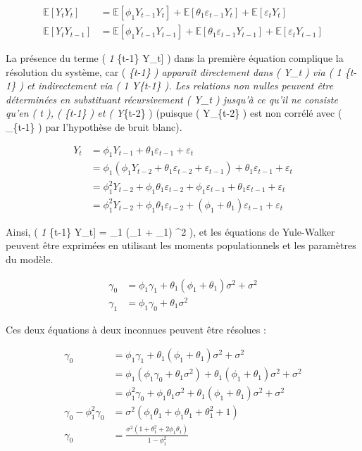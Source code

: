 \documentclass[
  letterpaper,
  DIV=11,
  numbers=noendperiod]{scrartcl}
\begin{document}
\[
\begin{aligned}
\mathbb{E}[Y_t Y_t] &= \mathbb{E}[\phi_1 Y_{t-1} Y_t] + \mathbb{E}[\theta_1 \varepsilon_{t-1} Y_t] + \mathbb{E}[\varepsilon_t Y_t] \\
\mathbb{E}[Y_t Y_{t-1}] &= \mathbb{E}[\phi_1 Y_{t-1} Y_{t-1}] + \mathbb{E}[\theta_1 \varepsilon_{t-1} Y_{t-1}] + \mathbb{E}[\varepsilon_t Y_{t-1}]
\end{aligned}
\]

La présence du terme ( \mathbb{E}{[}\theta\emph{1 \varepsilon}\{t-1\}
Y\_t{]} ) dans la première équation complique la résolution du système,
car ( \varepsilon\emph{\{t-1\} ) apparaît directement dans ( Y\_t ) via
( \theta\emph{1 \varepsilon}\{t-1\} ) et indirectement via ( \phi\emph{1
Y}\{t-1\} ). Les relations non nulles peuvent être déterminées en
substituant récursivement ( Y\_t ) jusqu'à ce qu'il ne consiste qu'en (
\varepsilon\emph{t ), ( \varepsilon}\{t-1\} ) et ( Y}\{t-2\} ) (puisque
( Y\_\{t-2\} ) est non corrélé avec ( \varepsilon\_\{t-1\} ) par
l'hypothèse de bruit blanc).

\[
\begin{aligned}
Y_t &= \phi_1 Y_{t-1} + \theta_1 \varepsilon_{t-1} + \varepsilon_t \\
&= \phi_1 (\phi_1 Y_{t-2} + \theta_1 \varepsilon_{t-2} + \varepsilon_{t-1}) + \theta_1 \varepsilon_{t-1} + \varepsilon_t \\
&= \phi_1^2 Y_{t-2} + \phi_1 \theta_1 \varepsilon_{t-2} + \phi_1 \varepsilon_{t-1} + \theta_1 \varepsilon_{t-1} + \varepsilon_t \\
&= \phi_1^2 Y_{t-2} + \phi_1 \theta_1 \varepsilon_{t-2} + (\phi_1 + \theta_1) \varepsilon_{t-1} + \varepsilon_t
\end{aligned}
\]

Ainsi, ( \mathbb{E}{[}\theta\emph{1 \varepsilon}\{t-1\} Y\_t{]} =
\theta\_1 (\phi\_1 + \theta\_1) \sigma\^{}2 ), et les équations de
Yule-Walker peuvent être exprimées en utilisant les moments
populationnels et les paramètres du modèle.

\[
\begin{aligned}
\gamma_0 &= \phi_1 \gamma_1 + \theta_1 (\phi_1 + \theta_1) \sigma^2 + \sigma^2 \\
\gamma_1 &= \phi_1 \gamma_0 + \theta_1 \sigma^2
\end{aligned}
\]

Ces deux équations à deux inconnues peuvent être résolues :

\[
\begin{aligned}
\gamma_0 &= \phi_1 \gamma_1 + \theta_1 (\phi_1 + \theta_1) \sigma^2 + \sigma^2 \\
&= \phi_1 (\phi_1 \gamma_0 + \theta_1 \sigma^2) + \theta_1 (\phi_1 + \theta_1) \sigma^2 + \sigma^2 \\
&= \phi_1^2 \gamma_0 + \phi_1 \theta_1 \sigma^2 + \theta_1 (\phi_1 + \theta_1) \sigma^2 + \sigma^2 \\
\gamma_0 - \phi_1^2 \gamma_0 &= \sigma^2 (\phi_1 \theta_1 + \phi_1 \theta_1 + \theta_1^2 + 1) \\
\gamma_0 &= \frac{\sigma^2 (1 + \theta_1^2 + 2 \phi_1 \theta_1)}{1 - \phi_1^2}
\end{aligned}
\]
\end{document}
